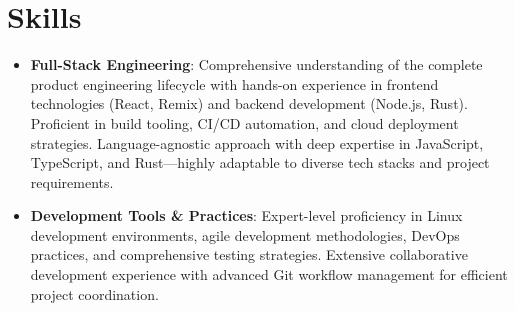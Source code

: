 \documentclass{resume}
\newcommand{\en}[1]{#1}
\newcommand{\zh}[1]{}
\begin{document}
\section{\en{Skills}\zh{技能}}
\begin{itemize}[parsep=0.25ex]
      \item \en{\textbf{Full-Stack Engineering}: Comprehensive understanding of the complete product engineering lifecycle with hands-on experience in frontend technologies (React, Remix) and backend development (Node.js, Rust). Proficient in build tooling, CI/CD automation, and cloud deployment strategies. Language-agnostic approach with deep expertise in JavaScript, TypeScript, and Rust—highly adaptable to diverse tech stacks and project requirements.}
            \zh{\textbf{全栈工程能力}: 对产品全流程工程有深入理解，具备前端（如 React、Remix）和后端（如 Node.js、Rust）开发经验，熟悉构建环境、CI/CD 自动化与云端部署。不局限于特定语言，尤为熟悉 JavaScript、TypeScript、Rust，具备多语言开发能力，能够灵活适应不同技术栈和项目需求。}
      \item \en{\textbf{Development Tools \& Practices}: Expert-level proficiency in Linux development environments, agile development methodologies, DevOps practices, and comprehensive testing strategies. Extensive collaborative development experience with advanced Git workflow management for efficient project coordination.}
            \zh{\textbf{开发工具与实践}: 精通 Linux 环境开发，熟练掌握敏捷开发流程、DevOps 实践及单元测试。团队协作经验丰富，擅长使用 Git 等工具高效管理项目。}
\end{itemize}
\end{document}
